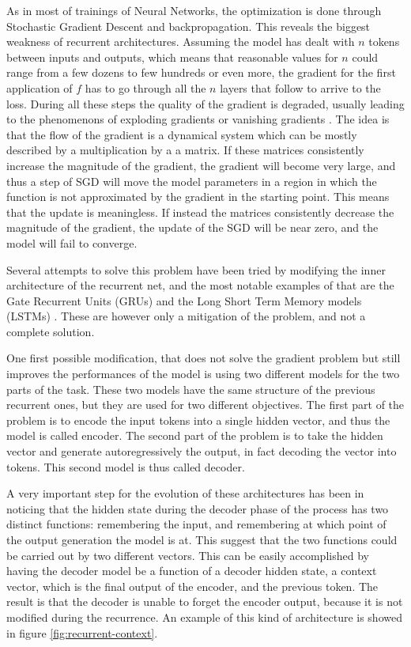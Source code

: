 \documentclass[]{marticle}
\begin{document}
As in most of trainings of Neural Networks, the optimization is done through Stochastic Gradient
Descent and backpropagation. This reveals the biggest weakness of recurrent architectures. Assuming
the model has dealt with $n$ tokens between inputs and outputs, which means that reasonable values
for $n$ could range from a few dozens to few hundreds or even more, the gradient for the first
application of $f$ has to go through all the $n$ layers that follow to arrive to the loss. During
all these steps the quality of the gradient is degraded, usually leading to the phenomenons of
exploding gradients or vanishing gradients \cite{difficult-rnn}. The idea is that the flow of the
gradient is a dynamical system which can be mostly described by a multiplication by a a matrix. If
these matrices consistently increase the magnitude of the gradient, the gradient will become very
large, and thus a step of SGD will move the model parameters in a region in which the function is
not approximated by the gradient in the starting point. This means that the update is meaningless.
If instead the matrices consistently decrease the magnitude of the gradient, the update of the SGD
will be near zero, and the model will fail to converge.

Several attempts to solve this problem have been tried by modifying the inner architecture of the
recurrent net, and the most notable examples of that are the Gate Recurrent Units (GRUs) and the
Long Short Term Memory models (LSTMs) \cite{gated-networks}. These are however only a mitigation of
the problem, and not a complete solution.

One first possible modification, that does not solve the gradient problem but still improves the
performances of the model is using two different models for the two parts of the task. These two
models have the same structure of the previous recurrent ones, but they are used for two different
objectives. The first part of the problem is to encode the input tokens into a single hidden vector,
and thus the model is called encoder. The second part of the problem is to take the hidden vector
and generate autoregressively the output, in fact decoding the vector into tokens. This second model
is thus called decoder.

A very important step for the evolution of these architectures has been in noticing that the hidden
state during the decoder phase of the process has two distinct functions: remembering the input, and
remembering at which point of the output generation the model is at. This suggest that the two
functions could be carried out by two different vectors. This can be easily accomplished by having
the decoder model be a function of a decoder hidden state, a context vector, which is the final
output of the encoder, and the previous token. The result is that the decoder is unable to forget
the encoder output, because it is not modified during the recurrence. An example of this kind of
architecture is showed in figure \ref{fig:recurrent-context}.
\end{document}

